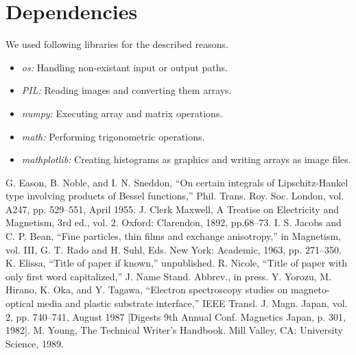 \documentclass[conference]{IEEEtran}
\begin{document}
\section{Dependencies}
We used following libraries for the described reasons.
\begin{itemize}
	\item \textit{os:} Handling non-existant input or output paths.
	\item \textit{PIL:} Reading images and converting them arrays.
	\item \textit{numpy:} Executing array and matrix operations.
	\item \textit{math:} Performing trigonometric operations.
	\item \textit{mathplotlib:} Creating histograms as graphics and writing arrays as image files.
\end{itemize}

\begin{thebibliography}{00}
 G. Eason, B. Noble, and I. N. Sneddon, ``On certain integrals of Lipschitz-Hankel type involving products of Bessel functions,'' Phil. Trans. Roy. Soc. London, vol. A247, pp. 529--551, April 1955.
 J. Clerk Maxwell, A Treatise on Electricity and Magnetism, 3rd ed., vol. 2. Oxford: Clarendon, 1892, pp.68--73.
 I. S. Jacobs and C. P. Bean, ``Fine particles, thin films and exchange anisotropy,'' in Magnetism, vol. III, G. T. Rado and H. Suhl, Eds. New York: Academic, 1963, pp. 271--350.
 K. Elissa, ``Title of paper if known,'' unpublished.
 R. Nicole, ``Title of paper with only first word capitalized,'' J. Name Stand. Abbrev., in press.
 Y. Yorozu, M. Hirano, K. Oka, and Y. Tagawa, ``Electron spectroscopy studies on magneto-optical media and plastic substrate interface,'' IEEE Transl. J. Magn. Japan, vol. 2, pp. 740--741, August 1987 [Digests 9th Annual Conf. Magnetics Japan, p. 301, 1982].
 M. Young, The Technical Writer's Handbook. Mill Valley, CA: University Science, 1989.
\end{thebibliography}
\end{document}
